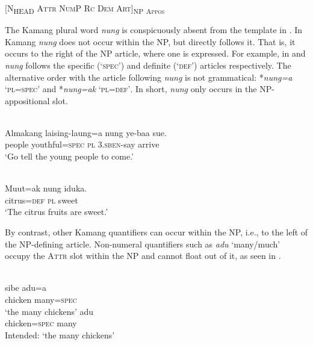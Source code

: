  [\textsc{N}\textsc{\textsubscript{\upshape HEAD}}\textsc{ Attr  NumP  Rc  Dem  Art]}\textsc{\textsubscript{\upshape NP}} \textsc{\textsubscript{\upshape Appos}}

\z


The Kamang plural word \textit{nung} is conspicuously absent from the template in . In Kamang \textit{nung} does not occur within the NP, but directly follows it. That is, it occurs to the right of the NP article, where one is expressed. For example, in  and  \textit{nung} follows the specific (`\textsc{spec}') and definite (`\textsc{def}') articles respectively. The alternative order with the article following \textit{nung} is not grammatical: *\textit{nung=a} `\textsc{pl=spec}' and *\textit{nung=ak} `\textsc{pl=def'}. In short, \textit{nung} only occurs in the NP-appositional slot.


\ea%
\label{ex:9:32}
 \\
\gll  Almakang laising-laung=a nung {ye}{{\textglotstop}}{-baa} sue. \\
  people youthful=\textsc{spec} \textsc{pl} \textsc{3.sben}-say arrive  \\
\glt `Go tell the young people to come.'
\z







\ea%
\label{ex:9:33}
 \\
\gll  Muut=ak nung iduka. \\
  citrus=\textsc{def} \textsc{pl} sweet   \\
\glt `The citrus fruits are sweet.'
\z






By contrast, other Kamang quantifiers can occur within the NP, i.e., to the left of the NP-defining article. Non-numeral quantifiers such as \textit{adu} `many/much' occupy the \textsc{Attr} slot within the NP and cannot float out of it, as seen in .


\ea%
\label{ex:9:34}
 \\
\ea
\gll sibe adu=a \\
  chicken many=\textsc{spec} \\
\glt `the many chickens' 
\ex
{} {adu} \\
chicken=\textsc{spec} many \\
\glt Intended: `the many chickens'
\z
\z



